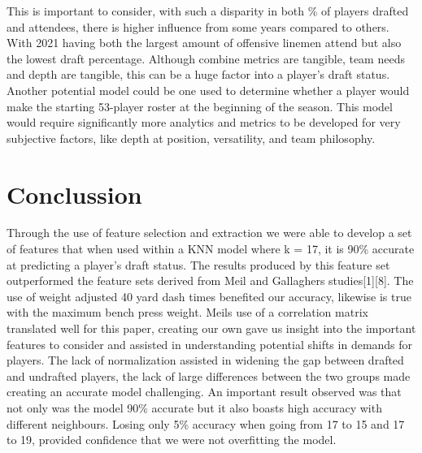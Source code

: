 \documentclass[confrence]{IEEEtran}
\begin{document}
This is important to consider, with such a disparity in both \% of players drafted and attendees, there is higher influence from some years compared to others.
With 2021 having both the largest amount of offensive linemen attend but also the lowest draft percentage.
Although combine metrics are tangible, team needs and depth are tangible, this can be a huge factor into a player's draft status.
Another potential model could be one used to determine whether a player would make the starting 53-player roster at the beginning of the season.
This model would require significantly more analytics and metrics to be developed for very subjective factors, like depth at position, versatility, and team philosophy.
\section*{Conclussion}
Through the use of feature selection and extraction we were able to develop a set of features that when used within a KNN model where k = 17, it is 90\% accurate at predicting a player's draft status.
The results produced by this feature set outperformed the feature sets derived from Meil and Gallaghers studies[1][8].
The use of weight adjusted 40 yard dash times benefited our accuracy, likewise is true with the maximum bench press weight.
Meils use of a correlation matrix translated well for this paper, creating our own gave us insight into the important features to consider and assisted in understanding potential shifts in demands for players.
The lack of normalization assisted in widening the gap between drafted and undrafted players, the lack of large differences between the two groups made creating an accurate model challenging.
An important result observed was that not only was the model 90\% accurate but it also boasts high accuracy with different neighbours.
Losing only 5\% accuracy when going from 17 to 15 and 17 to 19, provided confidence that we were not overfitting the model.
\end{document}
